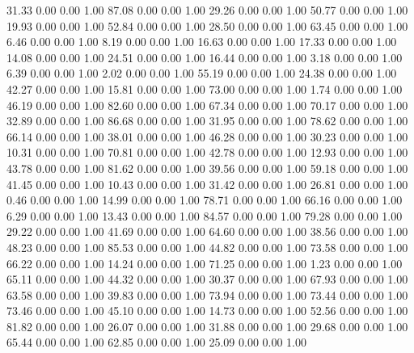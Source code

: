    31.33   0.00   0.00   1.00
   87.08   0.00   0.00   1.00
   29.26   0.00   0.00   1.00
   50.77   0.00   0.00   1.00
   19.93   0.00   0.00   1.00
   52.84   0.00   0.00   1.00
   28.50   0.00   0.00   1.00
   63.45   0.00   0.00   1.00
    6.46   0.00   0.00   1.00
    8.19   0.00   0.00   1.00
   16.63   0.00   0.00   1.00
   17.33   0.00   0.00   1.00
   14.08   0.00   0.00   1.00
   24.51   0.00   0.00   1.00
   16.44   0.00   0.00   1.00
    3.18   0.00   0.00   1.00
    6.39   0.00   0.00   1.00
    2.02   0.00   0.00   1.00
   55.19   0.00   0.00   1.00
   24.38   0.00   0.00   1.00
   42.27   0.00   0.00   1.00
   15.81   0.00   0.00   1.00
   73.00   0.00   0.00   1.00
    1.74   0.00   0.00   1.00
   46.19   0.00   0.00   1.00
   82.60   0.00   0.00   1.00
   67.34   0.00   0.00   1.00
   70.17   0.00   0.00   1.00
   32.89   0.00   0.00   1.00
   86.68   0.00   0.00   1.00
   31.95   0.00   0.00   1.00
   78.62   0.00   0.00   1.00
   66.14   0.00   0.00   1.00
   38.01   0.00   0.00   1.00
   46.28   0.00   0.00   1.00
   30.23   0.00   0.00   1.00
   10.31   0.00   0.00   1.00
   70.81   0.00   0.00   1.00
   42.78   0.00   0.00   1.00
   12.93   0.00   0.00   1.00
   43.78   0.00   0.00   1.00
   81.62   0.00   0.00   1.00
   39.56   0.00   0.00   1.00
   59.18   0.00   0.00   1.00
   41.45   0.00   0.00   1.00
   10.43   0.00   0.00   1.00
   31.42   0.00   0.00   1.00
   26.81   0.00   0.00   1.00
    0.46   0.00   0.00   1.00
   14.99   0.00   0.00   1.00
   78.71   0.00   0.00   1.00
   66.16   0.00   0.00   1.00
    6.29   0.00   0.00   1.00
   13.43   0.00   0.00   1.00
   84.57   0.00   0.00   1.00
   79.28   0.00   0.00   1.00
   29.22   0.00   0.00   1.00
   41.69   0.00   0.00   1.00
   64.60   0.00   0.00   1.00
   38.56   0.00   0.00   1.00
   48.23   0.00   0.00   1.00
   85.53   0.00   0.00   1.00
   44.82   0.00   0.00   1.00
   73.58   0.00   0.00   1.00
   66.22   0.00   0.00   1.00
   14.24   0.00   0.00   1.00
   71.25   0.00   0.00   1.00
    1.23   0.00   0.00   1.00
   65.11   0.00   0.00   1.00
   44.32   0.00   0.00   1.00
   30.37   0.00   0.00   1.00
   67.93   0.00   0.00   1.00
   63.58   0.00   0.00   1.00
   39.83   0.00   0.00   1.00
   73.94   0.00   0.00   1.00
   73.44   0.00   0.00   1.00
   73.46   0.00   0.00   1.00
   45.10   0.00   0.00   1.00
   14.73   0.00   0.00   1.00
   52.56   0.00   0.00   1.00
   81.82   0.00   0.00   1.00
   26.07   0.00   0.00   1.00
   31.88   0.00   0.00   1.00
   29.68   0.00   0.00   1.00
   65.44   0.00   0.00   1.00
   62.85   0.00   0.00   1.00
   25.09   0.00   0.00   1.00

